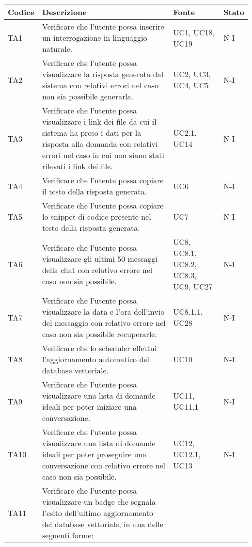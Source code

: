 \begin{table}[h!]
    \centering
    \renewcommand{\arraystretch}{1.5} %
    \begin{tabularx}{\textwidth}{|p{}|X|p{}|p{}|}\hline
    \rowcolor[HTML]{FFD700}
    \textbf{Codice} & \textbf{Descrizione} & \textbf{Fonte} & \textbf{Stato} \\ \hline
    TA1 & Verificare che l'utente possa inserire un interrogazione in linguaggio naturale. & UC1, UC18, UC19 & N-I \\ \hline
    TA2 & Verificare che l'utente possa visualizzare la risposta generata dal sistema con relativi errori nel caso non sia possibile generarla. & UC2, UC3, UC4, UC5 & N-I \\ \hline
    TA3 & Verificare che l'utente possa visualizzare i link dei file da cui il sistema ha preso i dati per la risposta alla domanda con relativi errori nel caso in cui non siano stati rilevati i link dei file.  & UC2.1, UC14 & N-I \\ \hline
    TA4 & Verificare che l'utente possa copiare il testo della risposta generata. & UC6 & N-I \\ \hline
    TA5 & Verificare che l'utente possa copiare lo snippet di codice presente nel testo della risposta generata. & UC7 & N-I \\ \hline
    TA6 & Verificare che l'utente possa visualizzare gli ultimi 50 messaggi della chat con relativo errore nel caso non sia possibile.  & UC8, UC8.1, UC8.2, UC8.3, UC9, UC27 & N-I \\ \hline
    TA7 & Verificare che l'utente possa visualizzare la data e l'ora dell'invio del messaggio con relativo errore nel caso non sia possibile recuperarle. & UC8.1.1, UC28 & N-I \\ \hline
    TA8 & Verificare che lo scheduler effettui l'aggiornamento automatico del database vettoriale. & UC10 & N-I \\ \hline
    TA9 & Verificare che l'utente possa visualizzare una lista di domande ideali per poter iniziare una conversazione. & UC11, UC11.1 & N-I \\ \hline
    TA10 & Verificare che l'utente possa visualizzare una lista di domande ideali per poter proseguire una conversazione con relativo errore nel caso non sia possibile. & UC12, UC12.1, UC13 & N-I \\ \hline
    TA11 & Verificare che l'utente possa visualizzare un badge che segnala l'esito dell'ultimo aggiornamento del database vettoriale, in una delle seguenti forme:

\end{tabularx}
\end{table}

